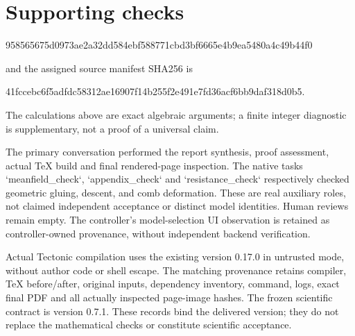 \documentclass[10pt]{article}
\begin{document}
\section*{Supporting checks}
958565675d0973ae2a32dd584ebf588771cbd3bf6665e4b9ea5480a4c49b44f0\par
and the assigned source manifest SHA256 is\par
41fccebc6f5adfdc58312ae16907f14b255f2e491e7fd36acf6bb9daf318d0b5.\par
The calculations above are exact algebraic arguments; a finite integer diagnostic is supplementary, not a proof of a universal claim.\par
The primary conversation performed the report synthesis, proof assessment, actual TeX build and final rendered-page inspection. The native tasks `meanfield\_check`, `appendix\_check` and `resistance\_check` respectively checked geometric gluing, descent, and comb deformation. These are real auxiliary roles, not claimed independent acceptance or distinct model identities. Human reviews remain empty. The controller’s model-selection UI observation is retained as controller-owned provenance, without independent backend verification.\par
Actual Tectonic compilation uses the existing version 0.17.0 in untrusted mode, without author code or shell escape. The matching provenance retains compiler, TeX before/after, original inputs, dependency inventory, command, logs, exact final PDF and all actually inspected page-image hashes. The frozen scientific contract is version 0.7.1. These records bind the delivered version; they do not replace the mathematical checks or constitute scientific acceptance.\par
\end{document}
